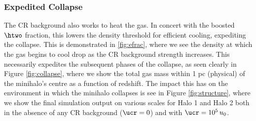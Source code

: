 \subsubsection{Expedited Collapse}
The CR background also works to heat the gas.  In concert with the boosted $\htwo$ fraction, this lowers the density threshold for efficient cooling, expediting the collapse.  This is demonstrated in \ref{fig:efrac}, where we see the density at which the gas begins to cool drop as the CR background strength increases.  This necessarily expedites the subsequent phases of the collapse, as seen clearly in Figure \ref{fig:collapse}, where we show the total gas mass within 1 pc (physical) of the minihalo's centre as a function of redshift.  The impact this has on the environment in which the minihalo collapses is see in Figure \ref{fig:structure}, where we show the final simulation output on various scales for Halo 1 and Halo 2 both in the absence of any CR background ($\ucr=0$) and with $\ucr=10^5\,u_0$.


